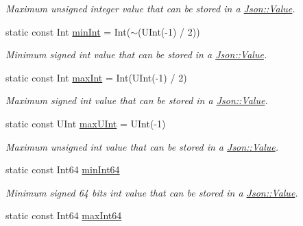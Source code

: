\begin{DoxyCompactItemize}
\begin{DoxyCompactList}\small\item\em Maximum unsigned integer value that can be stored in a \hyperlink{class_json_1_1_value}{Json\+::\+Value}. \end{DoxyCompactList}\item 
static const Int \hyperlink{class_json_1_1_value_a7df8a39e2502b8c92a6a41e3d752d2c8}{min\+Int} = Int($\sim$(U\+Int(-\/1) / 2))\hypertarget{class_json_1_1_value_a7df8a39e2502b8c92a6a41e3d752d2c8}{}\label{class_json_1_1_value_a7df8a39e2502b8c92a6a41e3d752d2c8}

\begin{DoxyCompactList}\small\item\em Minimum signed int value that can be stored in a \hyperlink{class_json_1_1_value}{Json\+::\+Value}. \end{DoxyCompactList}\item 
static const Int \hyperlink{class_json_1_1_value_a978c799a8af3114ef7dab6fd0a310a1b}{max\+Int} = Int(U\+Int(-\/1) / 2)\hypertarget{class_json_1_1_value_a978c799a8af3114ef7dab6fd0a310a1b}{}\label{class_json_1_1_value_a978c799a8af3114ef7dab6fd0a310a1b}

\begin{DoxyCompactList}\small\item\em Maximum signed int value that can be stored in a \hyperlink{class_json_1_1_value}{Json\+::\+Value}. \end{DoxyCompactList}\item 
static const U\+Int \hyperlink{class_json_1_1_value_ac79e63ee68d3aa914bfd6988be669b87}{max\+U\+Int} = U\+Int(-\/1)\hypertarget{class_json_1_1_value_ac79e63ee68d3aa914bfd6988be669b87}{}\label{class_json_1_1_value_ac79e63ee68d3aa914bfd6988be669b87}

\begin{DoxyCompactList}\small\item\em Maximum unsigned int value that can be stored in a \hyperlink{class_json_1_1_value}{Json\+::\+Value}. \end{DoxyCompactList}\item 
static const Int64 \hyperlink{class_json_1_1_value_a815ef899bc312c93bc426511acfe31a7}{min\+Int64}\hypertarget{class_json_1_1_value_a815ef899bc312c93bc426511acfe31a7}{}\label{class_json_1_1_value_a815ef899bc312c93bc426511acfe31a7}

\begin{DoxyCompactList}\small\item\em Minimum signed 64 bits int value that can be stored in a \hyperlink{class_json_1_1_value}{Json\+::\+Value}. \end{DoxyCompactList}\item 
static const Int64 \hyperlink{class_json_1_1_value_a4492634870b8c5709ce967b384ac6006}{max\+Int64}\hypertarget{class_json_1_1_value_a4492634870b8c5709ce967b384ac6006}{}\label{class_json_1_1_value_a4492634870b8c5709ce967b384ac6006}


\end{DoxyCompactItemize}
